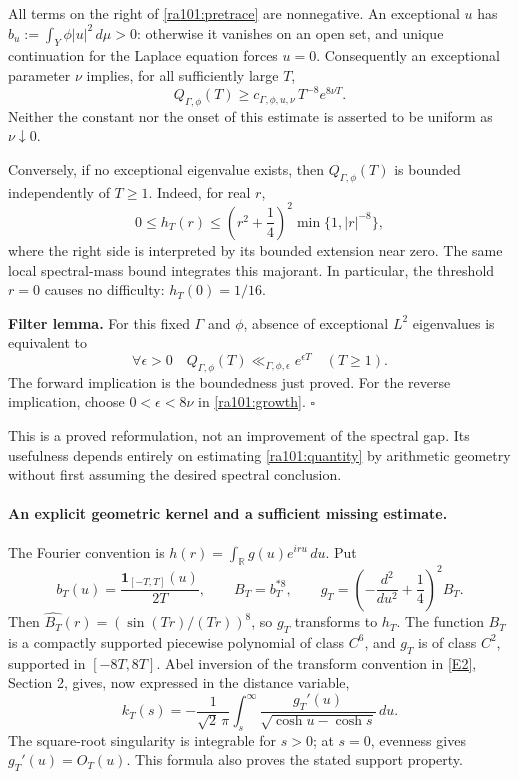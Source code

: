 \documentclass[11pt]{article}
\newcommand{\R}{\mathbb{R}}
\newcommand{\eref}[2]{\hyperlink{extra:#1:#2}{[E#2]}}
\begin{document}
All terms on the right of \eqref{ra101:pretrace} are nonnegative. An exceptional
$u$ has
$b_u:=\int_Y\phi|u|^2\,d\mu>0$: otherwise it vanishes on an open set, and
unique continuation for the Laplace equation forces $u=0$. Consequently an
exceptional parameter $\nu$ implies, for all sufficiently large $T$,
\begin{equation}\label{ra101:growth}
 Q_{\Gamma,\phi}(T)\ge
       c_{\Gamma,\phi,u,\nu}\,T^{-8}e^{8\nu T}.
\end{equation}
Neither the constant nor the onset of this estimate is asserted to be uniform
as $\nu\downarrow0$.

Conversely, if no exceptional eigenvalue exists, then $Q_{\Gamma,\phi}(T)$
is bounded independently of $T\ge1$. Indeed, for real $r$,
\[
 0\le h_T(r)\le
 \left(r^2+\frac14\right)^2\min\{1,|r|^{-8}\},
\]
where the right side is interpreted by its bounded extension near zero.
The same local spectral-mass bound integrates this majorant. In particular,
the threshold $r=0$ causes no difficulty: $h_T(0)=1/16$.

\textbf{Filter lemma.} For this fixed $\Gamma$ and $\phi$, absence of
exceptional $L^2$ eigenvalues is equivalent to
\begin{equation}\label{ra101:subexp}
 \forall\epsilon>0\quad
 Q_{\Gamma,\phi}(T)\ll_{\Gamma,\phi,\epsilon}e^{\epsilon T}
 \quad(T\ge1).
\end{equation}
The forward implication is the boundedness just proved. For the reverse
implication, choose $0<\epsilon<8\nu$ in \eqref{ra101:growth}.
\hfill$\square$

This is a proved reformulation, not an improvement of the spectral gap.
Its usefulness depends entirely on estimating \eqref{ra101:quantity} by
arithmetic geometry without first assuming the desired spectral conclusion.

\paragraph{An explicit geometric kernel and a sufficient missing estimate.}
The Fourier convention is $h(r)=\int_{\R}g(u)e^{iru}\,du$. Put
\[
 b_T(u)=\frac{\mathbf 1_{[-T,T]}(u)}{2T},\qquad
 B_T=b_T^{*8},\qquad
 g_T=\left(-\frac{d^2}{du^2}+\frac14\right)^2B_T.
\]
Then $\widehat{B_T}(r)=(\sin(Tr)/(Tr))^8$, so $g_T$ transforms to $h_T$.
The function $B_T$ is a compactly supported piecewise polynomial of class
$C^6$, and $g_T$ is of class $C^2$, supported in $[-8T,8T]$.
Abel inversion of the transform convention in \eref{101}{2}, Section 2,
gives, now expressed in the distance variable,
\begin{equation}\label{ra101:inverse}
 k_T(s)=-\frac1{\sqrt2\,\pi}
       \int_s^\infty\frac{g_T'(u)}{\sqrt{\cosh u-\cosh s}}\,du.
\end{equation}
The square-root singularity is integrable for $s>0$; at $s=0$, evenness gives
$g_T'(u)=O_T(u)$. This formula also proves the stated support property.
\end{document}
